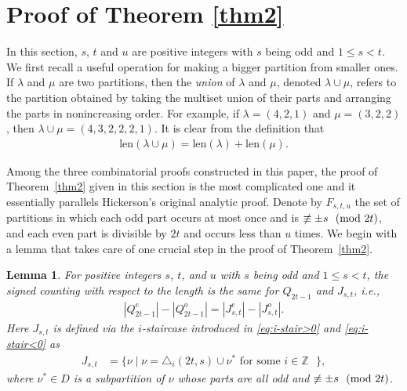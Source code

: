 \documentclass[12pt,reqno]{amsart}
\newtheorem{Lemma}[Theorem]{Lemma}
\numberwithin{equation}{section}
\newcommand{\len}{\mathrm{len}}
\def\bZ{\mathbb{Z}}
\newcommand{\tpmod}[1]{\mkern 12mu(\textup{mod}\mkern 6mu #1)}
\begin{document}
\section{Proof of Theorem \ref{thm2}\label{Po2}}
In this section, $s$, $t$ and $u$ are positive integers with $s$ being odd and $1\leq s<t$. We first recall a useful operation for making a bigger partition from smaller ones. If $\lambda$ and $\mu$ are two partitions, then the \emph{union} of $\lambda$ and $\mu$, denoted $\lambda\cup\mu$, refers to the partition obtained by taking the multiset union of their parts and arranging the parts in nonincreasing order. For example, if $\lambda=(4,2,1)$ and $\mu=(3,2,2)$, then $\lambda\cup\mu=(4,3,2,2,2,1)$. It is clear from the definition that
\begin{align*}
	\len(\lambda \cup \mu)=\len(\lambda)+\len(\mu).
\end{align*}

Among the three combinatorial proofs constructed in this paper, the proof of Theorem~\ref{thm2} given in this section is the most complicated one and it essentially parallels Hickerson's original analytic proof. Denote by $F_{s,t,u}$ the set of partitions in which each odd part occurs at most once and is $\not\equiv \pm s \tpmod{2t}$, and each even part is divisible by $2t$ and occurs less than $u$ times. We begin with a lemma that takes care of one crucial step in the proof of Theorem~\ref{thm2}.

\begin{Lemma}\label{lem:lambda1}
For positive integers $s$, $t$, and $u$ with $s$ being odd and $1\leq s<t$, the signed counting with respect to the length is the same for $Q_{2t-1}$ and $J_{s,t}$, i.e.,
\begin{align}
|Q^e_{2t-1}|-|Q^o_{2t-1}|=|J^e_{s,t}|-|J^o_{s,t}|.\label{Q and J}
\end{align}
Here $J_{s,t}$ is defined via the $i$-staircase introduced in \eqref{eq:i-stair>0} and \eqref{eq:i-stair<0} as
\begin{align}
		J_{s,t} &= \{\nu \mid \nu=\triangle_i(2t,s)\cup \nu^* \text{ for some $i\in\bZ$ }\},\label{def:Jst}
\end{align}
where $\nu^*\in D$ is a subpartition of $\nu$ whose parts are all odd and $\not\equiv \pm s\tpmod{2t}$.
\end{Lemma}
\end{document}
